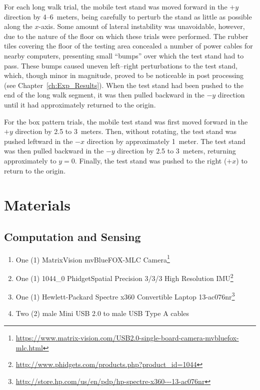 For each long walk trial, the mobile test stand was moved forward in the $+y$ direction by 4--6~meters, being carefully to perturb the stand as little as possible along the $x$-axis. Some amount of lateral instability was unavoidable, however, due to the nature of the floor on which these trials were performed. The rubber tiles covering the floor of the testing area concealed a number of power cables for nearby computers, presenting small ``bumps'' over which the test stand had to pass. These bumps caused uneven left--right perturbations to the test stand, which, though minor in magnitude, proved to be noticeable in post processing (see Chapter~\ref{ch:Exp_Results}). When the test stand had been pushed to the end of the long walk segment, it was then pulled backward in the $-y$ direction until it had approximately returned to the origin.

For the box pattern trials, the mobile test stand was first moved forward in the $+y$ direction by 2.5 to 3~meters. Then, without rotating, the test stand was pushed leftward in the $-x$ direction by approximately 1~meter. The test stand was then pulled backward in the $-y$ direction by 2.5 to 3~meters, returning approximately to $y = 0$. Finally, the test stand was pushed to the right ($+x$) to return to the origin.

\clearpage
\section{Materials}
\subsection{Computation and Sensing}
\begin{enumerate}
\item One (1) MatrixVision mvBlueFOX-MLC Camera\footnote{\url{https://www.matrix-vision.com/USB2.0-single-board-camera-mvbluefox-mlc.html}}
\item One (1) 1044\_0 PhidgetSpatial Precision 3/3/3 High Resolution IMU\footnote{\url{http://www.phidgets.com/products.php?product_id=1044}}
\item One (1) Hewlett-Packard Spectre x360 Convertible Laptop 13-ac076nr\footnote{\url{http://store.hp.com/us/en/pdp/hp-spectre-x360---13-ac076nr}}
\item Two (2) male Mini USB 2.0 to male USB Type A cables
\end{enumerate}
